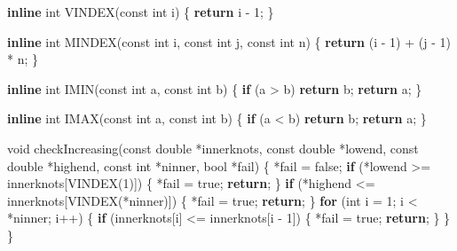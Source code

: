 \documentclass[
  12pt,
]{book}
\newenvironment{Shaded}{\begin{snugshade}}{\end{snugshade}}
\newcommand{\ControlFlowTok}[1]{\textcolor[rgb]{0.13,0.29,0.53}{\textbf{#1}}}
\newcommand{\DataTypeTok}[1]{\textcolor[rgb]{0.13,0.29,0.53}{#1}}
\newcommand{\DecValTok}[1]{\textcolor[rgb]{0.00,0.00,0.81}{#1}}
\newcommand{\KeywordTok}[1]{\textcolor[rgb]{0.13,0.29,0.53}{\textbf{#1}}}
\newcommand{\NormalTok}[1]{#1}
\theoremstyle{definition}
\theoremstyle{definition}
\theoremstyle{definition}
\theoremstyle{definition}
\theoremstyle{remark}
\begin{document}
\begin{Shaded}
\begin{Highlighting}[]
\KeywordTok{inline} \DataTypeTok{int}\NormalTok{ VINDEX(}\DataTypeTok{const} \DataTypeTok{int}\NormalTok{ i) \{ }\ControlFlowTok{return}\NormalTok{ i {-} }\DecValTok{1}\NormalTok{; \}}

\KeywordTok{inline} \DataTypeTok{int}\NormalTok{ MINDEX(}\DataTypeTok{const} \DataTypeTok{int}\NormalTok{ i, }\DataTypeTok{const} \DataTypeTok{int}\NormalTok{ j, }\DataTypeTok{const} \DataTypeTok{int}\NormalTok{ n) \{}
    \ControlFlowTok{return}\NormalTok{ (i {-} }\DecValTok{1}\NormalTok{) + (j {-} }\DecValTok{1}\NormalTok{) * n;}
\NormalTok{\}}

\KeywordTok{inline} \DataTypeTok{int}\NormalTok{ IMIN(}\DataTypeTok{const} \DataTypeTok{int}\NormalTok{ a, }\DataTypeTok{const} \DataTypeTok{int}\NormalTok{ b) \{}
    \ControlFlowTok{if}\NormalTok{ (a \textgreater{} b) }\ControlFlowTok{return}\NormalTok{ b;}
    \ControlFlowTok{return}\NormalTok{ a;}
\NormalTok{\}}

\KeywordTok{inline} \DataTypeTok{int}\NormalTok{ IMAX(}\DataTypeTok{const} \DataTypeTok{int}\NormalTok{ a, }\DataTypeTok{const} \DataTypeTok{int}\NormalTok{ b) \{}
    \ControlFlowTok{if}\NormalTok{ (a \textless{} b) }\ControlFlowTok{return}\NormalTok{ b;}
    \ControlFlowTok{return}\NormalTok{ a;}
\NormalTok{\}}

\DataTypeTok{void}\NormalTok{ checkIncreasing(}\DataTypeTok{const} \DataTypeTok{double}\NormalTok{ *innerknots, }\DataTypeTok{const} \DataTypeTok{double}\NormalTok{ *lowend,}
                     \DataTypeTok{const} \DataTypeTok{double}\NormalTok{ *highend, }\DataTypeTok{const} \DataTypeTok{int}\NormalTok{ *ninner, }\DataTypeTok{bool}\NormalTok{ *fail) \{}
\NormalTok{    *fail = false;}
    \ControlFlowTok{if}\NormalTok{ (*lowend \textgreater{}= innerknots[VINDEX(}\DecValTok{1}\NormalTok{)]) \{}
\NormalTok{        *fail = true;}
        \ControlFlowTok{return}\NormalTok{;}
\NormalTok{    \}}
    \ControlFlowTok{if}\NormalTok{ (*highend \textless{}= innerknots[VINDEX(*ninner)]) \{}
\NormalTok{        *fail = true;}
        \ControlFlowTok{return}\NormalTok{;}
\NormalTok{    \}}
    \ControlFlowTok{for}\NormalTok{ (}\DataTypeTok{int}\NormalTok{ i = }\DecValTok{1}\NormalTok{; i \textless{} *ninner; i++) \{}
        \ControlFlowTok{if}\NormalTok{ (innerknots[i] \textless{}= innerknots[i {-} }\DecValTok{1}\NormalTok{]) \{}
\NormalTok{            *fail = true;}
            \ControlFlowTok{return}\NormalTok{;}
\NormalTok{        \}}
\NormalTok{    \}}
\NormalTok{\}}


\end{Highlighting}
\end{Shaded}
\end{document}
